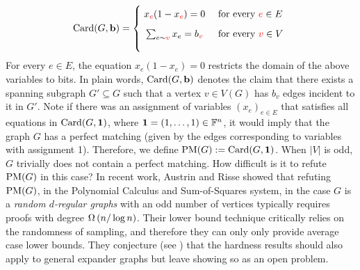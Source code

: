 \documentclass[11pt]{article}
\begin{document}
\[
        \Card{G, \vec{b}}=
        \Bigger[10]\{\begin{array}{@{}cl}
                x_{\highlight{e}}(1 - x_{\highlight{e}}) = 0 & \text{ for every $\highlight{e} \in E$}\\[3mm]
                \sum_{e \sim \highlight{v}} x_e = b_{\highlight{v}} & \text{ for every $\highlight{v} \in V$} \\[3mm]
        \end{array}
\]
For every $e \in E$, the equation $x_e(1 - x_e) = 0$ restricts the domain of the above variables to bits.
In plain words, $\text{Card}(G, \mathbf{b})$ denotes the claim that there exists a spanning subgraph $G' \subseteq G$ such that a vertex $v \in V(G)$ has $b_v$ edges incident to it in $G'$.
Note if there was an assignment of variables $(x_e)_{e \in E}$ that satisfies all equations in $\text{Card}(G, \mathbf{1})$, where $\mathbf{1} = (1, \ldots, 1) \in \mathbb{F}^{n}$, it would imply that the graph $G$ has a perfect matching (given by the edges corresponding to variables with assignment 1).
Therefore, we define $\text{PM}(G) := \text{Card}(G, \mathbf{1})$.
When $|V|$ is odd, $G$ trivially does not contain a perfect matching. How difficult is it to refute $\text{PM}(G)$ in this case? In recent work, Austrin and Risse \cite{Austrin_2022} showed that refuting $\text{PM}(G)$, in the Polynomial Calculus  and Sum-of-Squares system, in the case $G$ is a \emph{random $d$-regular graphs} with an odd number of vertices typically requires proofs with degree $\Omega\left(n/\log n\right)$.
Their lower bound technique critically relies on the randomness of sampling, and therefore they can only only provide average case lower bounds.
They conjecture (see \citep[Section 6]{Austrin_2022}) that the hardness results should also apply to general expander graphs but leave showing so as an open problem.
\end{document}

